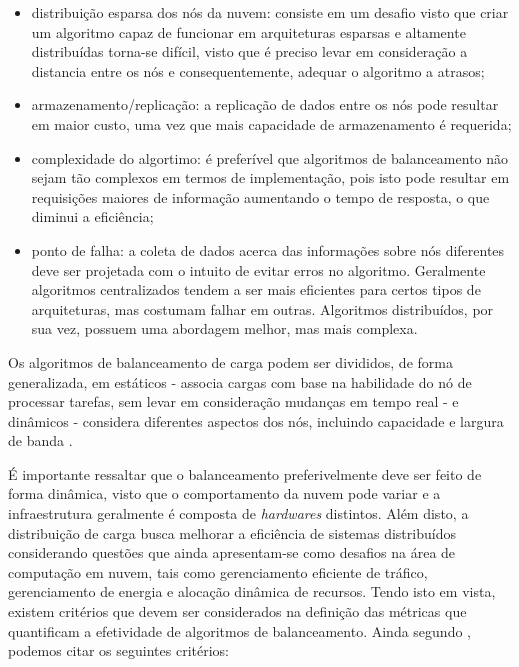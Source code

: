 \begin{itemize}
	\item distribuição esparsa dos nós da nuvem: consiste em um desafio visto que criar um algoritmo capaz de funcionar em arquiteturas esparsas e altamente distribuídas torna-se difícil, visto que é preciso levar em consideração a distancia entre os nós e consequentemente, adequar o algoritmo a atrasos; 
	
	\item armazenamento/replicação: a replicação de dados entre os nós pode resultar em maior custo, uma vez que mais capacidade de armazenamento é requerida;
	
	\item complexidade do algortimo: é preferível que algoritmos de balanceamento não sejam tão complexos em termos de implementação, pois isto pode resultar em requisições maiores de informação aumentando o tempo de resposta, o que diminui a eficiência; 
	
	\item ponto de falha: a coleta de dados acerca das informações sobre nós diferentes deve ser projetada com o intuito de evitar erros no algoritmo. Geralmente algoritmos centralizados tendem a ser mais eficientes para certos tipos de arquiteturas, mas costumam falhar em outras. Algoritmos distribuídos, por sua vez, possuem uma abordagem melhor, mas mais complexa.
\end{itemize}

Os algoritmos de balanceamento de carga podem ser divididos, de forma generalizada, em estáticos - associa cargas com base na habilidade do nó de processar tarefas, sem levar em consideração mudanças em tempo real - e dinâmicos - considera diferentes aspectos dos nós, incluindo capacidade e largura de banda \cite{surveycloud:2012}. 

É importante ressaltar que o balanceamento preferivelmente deve ser feito de forma dinâmica, visto que o comportamento da nuvem pode variar e a infraestrutura geralmente é composta de \textit{hardwares} distintos. Além disto, a distribuição de carga busca melhorar a eficiência de sistemas distribuídos considerando questões que ainda apresentam-se como desafios na área de computação em nuvem, tais como gerenciamento eficiente de tráfico, gerenciamento de energia e alocação dinâmica de recursos\cite{zhang2010cloud}. Tendo isto em vista, existem critérios que devem ser considerados na definição das métricas que quantificam a efetividade de algoritmos de balanceamento. Ainda segundo , podemos citar os seguintes critérios: 

